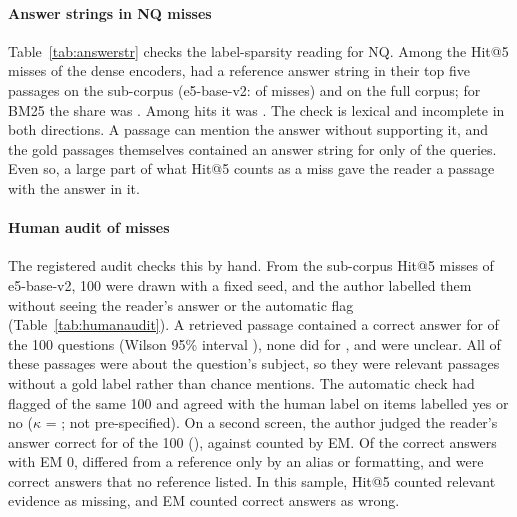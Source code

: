 \paragraph{Answer strings in NQ misses}
Table~\ref{tab:answerstr} checks the label-sparsity reading for NQ. Among the Hit@5 misses of the dense encoders,  had a reference answer string in their top five passages on the sub-corpus (e5-base-v2:   of  misses) and  on the full corpus; for BM25 the share was . Among hits it was . The check is lexical and incomplete in both directions. A passage can mention the answer without supporting it, and the gold passages themselves contained an answer string for only   of the queries. Even so, a large part of what Hit@5 counts as a miss gave the reader a passage with the answer in it.

\paragraph{Human audit of misses}
The registered audit checks this by hand. From the  sub-corpus Hit@5 misses of e5-base-v2, 100 were drawn with a fixed seed, and the author labelled them without seeing the reader's answer or the automatic flag (Table~\ref{tab:humanaudit}). A retrieved passage contained a correct answer for  of the 100 questions (Wilson 95\% interval ), none did for , and  were unclear. All  of these passages were about the question's subject, so they were relevant passages without a gold label rather than chance mentions. The automatic check had flagged  of the same 100 and agreed with the human label on  items labelled yes or no ($\kappa$ = ; not pre-specified). On a second screen, the author judged the reader's answer correct for  of the 100 (), against  counted by EM. Of the  correct answers with EM 0,  differed from a reference only by an alias or formatting, and  were correct answers that no reference listed. In this sample, Hit@5 counted relevant evidence as missing, and EM counted correct answers as wrong.






